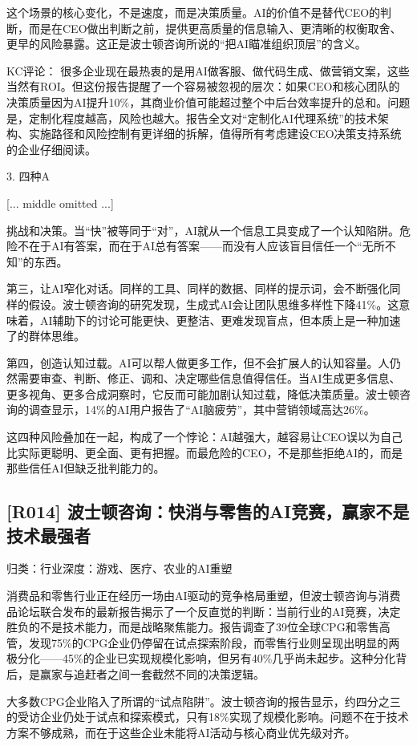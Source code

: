 \documentclass[11pt]{ctexart}
\begin{document}
这个场景的核心变化，不是速度，而是决策质量。AI的价值不是替代CEO的判断，而是在CEO做出判断之前，提供更高质量的信息输入、更清晰的权衡取舍、更早的风险暴露。这正是波士顿咨询所说的“把AI瞄准组织顶层”的含义。

KC评论： 很多企业现在最热衷的是用AI做客服、做代码生成、做营销文案，这些当然有ROI。但这份报告提醒了一个容易被忽视的层次：如果CEO和核心团队的决策质量因为AI提升10\%，其商业价值可能超过整个中后台效率提升的总和。问题是，定制化程度越高，风险也越大。报告全文对“定制化AI代理系统”的技术架构、实施路径和风险控制有更详细的拆解，值得所有考虑建设CEO决策支持系统的企业仔细阅读。

3. 四种A

[... middle omitted ...]

挑战和决策。当“快”被等同于“对”，AI就从一个信息工具变成了一个认知陷阱。危险不在于AI有答案，而在于AI总有答案——而没有人应该盲目信任一个“无所不知”的东西。

第三，让AI窄化对话。同样的工具、同样的数据、同样的提示词，会不断强化同样的假设。波士顿咨询的研究发现，生成式AI会让团队思维多样性下降41\%。这意味着，AI辅助下的讨论可能更快、更整洁、更难发现盲点，但本质上是一种加速了的群体思维。

第四，创造认知过载。AI可以帮人做更多工作，但不会扩展人的认知容量。人仍然需要审查、判断、修正、调和、决定哪些信息值得信任。当AI生成更多信息、更多视角、更多合成洞察时，它反而可能加剧认知过载，降低决策质量。波士顿咨询的调查显示，14\%的AI用户报告了“AI脑疲劳”，其中营销领域高达26\%。

这四种风险叠加在一起，构成了一个悖论：AI越强大，越容易让CEO误以为自己比实际更聪明、更全面、更有把握。而最危险的CEO，不是那些拒绝AI的，而是那些信任AI但缺乏批判能力的。

\subsection{[R014] 波士顿咨询：快消与零售的AI竞赛，赢家不是技术最强者}
{\small\color{refgray}归类：行业深度：游戏、医疗、农业的AI重塑}

消费品和零售行业正在经历一场由AI驱动的竞争格局重塑，但波士顿咨询与消费品论坛联合发布的最新报告揭示了一个反直觉的判断：当前行业的AI竞赛，决定胜负的不是技术能力，而是战略聚焦能力。报告调查了39位全球CPG和零售高管，发现75\%的CPG企业仍停留在试点探索阶段，而零售行业则呈现出明显的两极分化——45\%的企业已实现规模化影响，但另有40\%几乎尚未起步。这种分化背后，是赢家与追赶者之间一套截然不同的决策逻辑。

大多数CPG企业陷入了所谓的“试点陷阱”。波士顿咨询的报告显示，约四分之三的受访企业仍处于试点和探索模式，只有18\%实现了规模化影响。问题不在于技术方案不够成熟，而在于这些企业未能将AI活动与核心商业优先级对齐。
\end{document}

